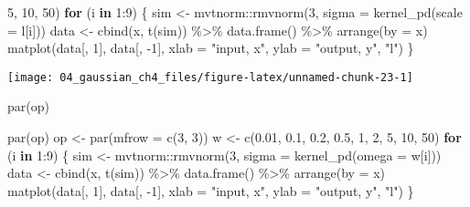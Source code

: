\documentclass[
]{article}
\newenvironment{Shaded}{\begin{snugshade}}{\end{snugshade}}
\newcommand{\AttributeTok}[1]{\textcolor[rgb]{0.77,0.63,0.00}{#1}}
\newcommand{\ControlFlowTok}[1]{\textcolor[rgb]{0.13,0.29,0.53}{\textbf{#1}}}
\newcommand{\DecValTok}[1]{\textcolor[rgb]{0.00,0.00,0.81}{#1}}
\newcommand{\FloatTok}[1]{\textcolor[rgb]{0.00,0.00,0.81}{#1}}
\newcommand{\FunctionTok}[1]{\textcolor[rgb]{0.00,0.00,0.00}{#1}}
\newcommand{\NormalTok}[1]{#1}
\newcommand{\OtherTok}[1]{\textcolor[rgb]{0.56,0.35,0.01}{#1}}
\newcommand{\SpecialCharTok}[1]{\textcolor[rgb]{0.00,0.00,0.00}{#1}}
\newcommand{\StringTok}[1]{\textcolor[rgb]{0.31,0.60,0.02}{#1}}
\begin{document}
\begin{Shaded}
\begin{Highlighting}[]
        \DecValTok{5}\NormalTok{, }\DecValTok{10}\NormalTok{, }\DecValTok{50}\NormalTok{)}
\ControlFlowTok{for}\NormalTok{ (i }\ControlFlowTok{in} \DecValTok{1}\SpecialCharTok{:}\DecValTok{9}\NormalTok{) \{}
\NormalTok{  sim }\OtherTok{\textless{}{-}}\NormalTok{ mvtnorm}\SpecialCharTok{::}\FunctionTok{rmvnorm}\NormalTok{(}\DecValTok{3}\NormalTok{, }\AttributeTok{sigma =} \FunctionTok{kernel\_pd}\NormalTok{(}\AttributeTok{scale =}\NormalTok{ l[i]))}
\NormalTok{  data }\OtherTok{\textless{}{-}} \FunctionTok{cbind}\NormalTok{(x, }\FunctionTok{t}\NormalTok{(sim)) }\SpecialCharTok{\%\textgreater{}\%}
    \FunctionTok{data.frame}\NormalTok{() }\SpecialCharTok{\%\textgreater{}\%}
    \FunctionTok{arrange}\NormalTok{(}\AttributeTok{by =}\NormalTok{ x)}
  \FunctionTok{matplot}\NormalTok{(data[, }\DecValTok{1}\NormalTok{], data[, }\SpecialCharTok{{-}}\DecValTok{1}\NormalTok{],}
    \AttributeTok{xlab =} \StringTok{"input, x"}\NormalTok{, }
    \AttributeTok{ylab =} \StringTok{"output, y"}\NormalTok{,}
    \StringTok{"l"}\NormalTok{)}
\NormalTok{\}}
\end{Highlighting}
\end{Shaded}

\begin{center}\texttt{[image: 04\_gaussian\_ch4\_files/figure-latex/unnamed-chunk-23-1]} \end{center}

\begin{Shaded}
\begin{Highlighting}[]
\FunctionTok{par}\NormalTok{(op)}

\FunctionTok{par}\NormalTok{(op)}
\NormalTok{op }\OtherTok{\textless{}{-}} \FunctionTok{par}\NormalTok{(}\AttributeTok{mfrow =} \FunctionTok{c}\NormalTok{(}\DecValTok{3}\NormalTok{, }\DecValTok{3}\NormalTok{))}
\NormalTok{w }\OtherTok{\textless{}{-}} \FunctionTok{c}\NormalTok{(}\FloatTok{0.01}\NormalTok{, }\FloatTok{0.1}\NormalTok{, }\FloatTok{0.2}\NormalTok{,}
       \FloatTok{0.5}\NormalTok{, }\DecValTok{1}\NormalTok{, }\DecValTok{2}\NormalTok{,}
       \DecValTok{5}\NormalTok{, }\DecValTok{10}\NormalTok{, }\DecValTok{50}\NormalTok{)}
\ControlFlowTok{for}\NormalTok{ (i }\ControlFlowTok{in} \DecValTok{1}\SpecialCharTok{:}\DecValTok{9}\NormalTok{) \{}
\NormalTok{  sim }\OtherTok{\textless{}{-}}\NormalTok{ mvtnorm}\SpecialCharTok{::}\FunctionTok{rmvnorm}\NormalTok{(}\DecValTok{3}\NormalTok{, }\AttributeTok{sigma =} \FunctionTok{kernel\_pd}\NormalTok{(}\AttributeTok{omega =}\NormalTok{ w[i]))}
\NormalTok{  data }\OtherTok{\textless{}{-}} \FunctionTok{cbind}\NormalTok{(x, }\FunctionTok{t}\NormalTok{(sim)) }\SpecialCharTok{\%\textgreater{}\%}
    \FunctionTok{data.frame}\NormalTok{() }\SpecialCharTok{\%\textgreater{}\%}
    \FunctionTok{arrange}\NormalTok{(}\AttributeTok{by =}\NormalTok{ x)}
  \FunctionTok{matplot}\NormalTok{(data[, }\DecValTok{1}\NormalTok{], data[, }\SpecialCharTok{{-}}\DecValTok{1}\NormalTok{],}
    \AttributeTok{xlab =} \StringTok{"input, x"}\NormalTok{, }
    \AttributeTok{ylab =} \StringTok{"output, y"}\NormalTok{,}
    \StringTok{"l"}\NormalTok{)}
\NormalTok{\}}
\end{Highlighting}
\end{Shaded}
\end{document}
